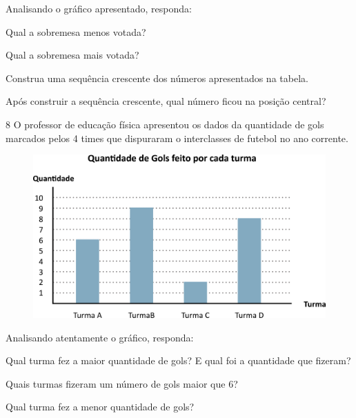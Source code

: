 Analisando o gráfico apresentado, responda:

\begin{escolha}
\item Qual a sobremesa menos votada?

\item Qual a sobremesa mais votada?

\item Construa uma sequência crescente dos números apresentados na tabela.

\item Após construir a sequência crescente, qual número ficou na posição central?
\end{escolha}

\num{8} O professor de educação física apresentou os dados da quantidade de gols
marcados pelos 4 times que dispuraram o interclasses de futebol no ano
corrente.

\begin{figure}[htpb!]
\centering
\includegraphics[width=.8\textwidth]{./media/image83.png}
\end{figure}

\pagebreak
Analisando atentamente o gráfico, responda:

\begin{escolha}
\item Qual turma fez a maior quantidade de gols? E qual foi a quantidade que fizeram?

\item Quais turmas fizeram um número de gols maior que 6?

\item Qual turma fez a menor quantidade de gols?
\end{escolha}

